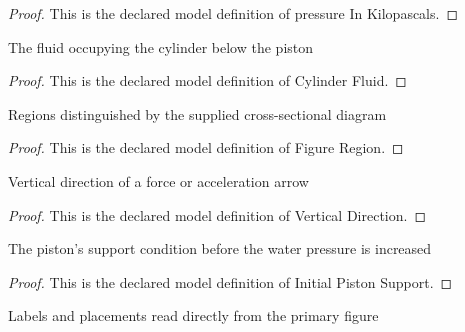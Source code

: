 \begin{proof}
  This is the declared model definition of pressure In Kilopascals.
\end{proof}
\begin{definition}
  \label{def:physics:phyx-mini-0384:phyxminiproblems-problemphyxmini0384-cylinderfluid}
  The fluid occupying the cylinder below the piston
\end{definition}
\begin{proof}
  This is the declared model definition of Cylinder Fluid.
\end{proof}
\begin{definition}
  \label{def:physics:phyx-mini-0384:phyxminiproblems-problemphyxmini0384-figureregion}
  Regions distinguished by the supplied cross-sectional diagram
\end{definition}
\begin{proof}
  This is the declared model definition of Figure Region.
\end{proof}
\begin{definition}
  \label{def:physics:phyx-mini-0384:phyxminiproblems-problemphyxmini0384-verticaldirection}
  Vertical direction of a force or acceleration arrow
\end{definition}
\begin{proof}
  This is the declared model definition of Vertical Direction.
\end{proof}
\begin{definition}
  \label{def:physics:phyx-mini-0384:phyxminiproblems-problemphyxmini0384-initialpistonsupport}
  The piston's support condition before the water pressure is increased
\end{definition}
\begin{proof}
  This is the declared model definition of Initial Piston Support.
\end{proof}
\begin{definition}
  \label{def:physics:phyx-mini-0384:phyxminiproblems-problemphyxmini0384-pistoncylinderfigure}
  Labels and placements read directly from the primary figure
\end{definition}
